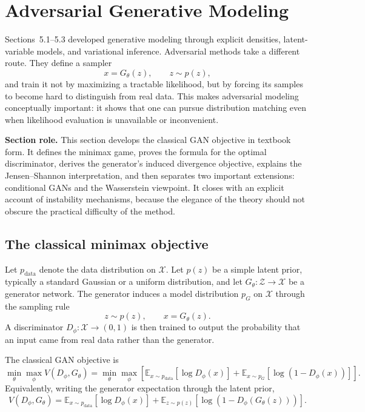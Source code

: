 
\section{Adversarial Generative Modeling}

Sections~5.1--5.3 developed generative modeling through explicit densities, latent-variable models, and variational inference.
Adversarial methods take a different route.
They define a sampler
\[
x = G_\theta(z), \qquad z\sim p(z),
\]
and train it not by maximizing a tractable likelihood, but by forcing its samples to become hard to distinguish from real data.
This makes adversarial modeling conceptually important: it shows that one can pursue distribution matching even when likelihood evaluation is unavailable or inconvenient.

\medskip

\noindent
\textbf{Section role.}
This section develops the classical GAN objective in textbook form.
It defines the minimax game, proves the formula for the optimal discriminator, derives the generator's induced divergence objective, explains the Jensen--Shannon interpretation, and then separates two important extensions: conditional GANs and the Wasserstein viewpoint.
It closes with an explicit account of instability mechanisms, because the elegance of the theory should not obscure the practical difficulty of the method.

\subsection*{The classical minimax objective}

Let $p_{\mathrm{data}}$ denote the data distribution on $\mathcal X$.
Let $p(z)$ be a simple latent prior, typically a standard Gaussian or a uniform distribution, and let $G_\theta: \mathcal Z\to \mathcal X$ be a generator network.
The generator induces a model distribution $p_G$ on $\mathcal X$ through the sampling rule
\[
z\sim p(z), \qquad x = G_\theta(z).
\]
A discriminator $D_\phi: \mathcal X\to (0,1)$ is then trained to output the probability that an input came from real data rather than the generator.

The classical GAN objective is
\[
\min_\theta \max_\phi V(D_\phi,G_\theta)
=
\min_\theta \max_\phi
\left[
\mathbb E_{x\sim p_{\mathrm{data}}}[\log D_\phi(x)]
+
\mathbb E_{x\sim p_G}[\log(1-D_\phi(x))]
\right].
\]
Equivalently, writing the generator expectation through the latent prior,
\[
V(D_\phi,G_\theta)
=
\mathbb E_{x\sim p_{\mathrm{data}}}[\log D_\phi(x)]
+
\mathbb E_{z\sim p(z)}[\log(1-D_\phi(G_\theta(z)))].
\]

